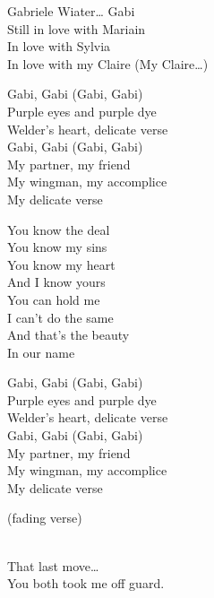 \begin{lyrics}
Gabriele Wiater… Gabi\\
Still in love with Mariain\\
In love with Sylvia\\
In love with my Claire
(My Claire…)

Gabi, Gabi (Gabi, Gabi)\\
Purple eyes and purple dye\\
Welder’s heart, delicate verse\\
Gabi, Gabi (Gabi, Gabi)\\
My partner, my friend\\
My wingman, my accomplice\\
My delicate verse


You know the deal\\
You know my sins\\
You know my heart\\
And I know yours\\
You can hold me\\
I can’t do the same\\
And that’s the beauty\\
In our name

Gabi, Gabi (Gabi, Gabi)\\
Purple eyes and purple dye\\
Welder’s heart, delicate verse\\
Gabi, Gabi (Gabi, Gabi)\\
My partner, my friend\\
My wingman, my accomplice\\
My delicate verse

(fading verse)

\\
That last move…\\
You both took me off guard.
\end{lyrics}

